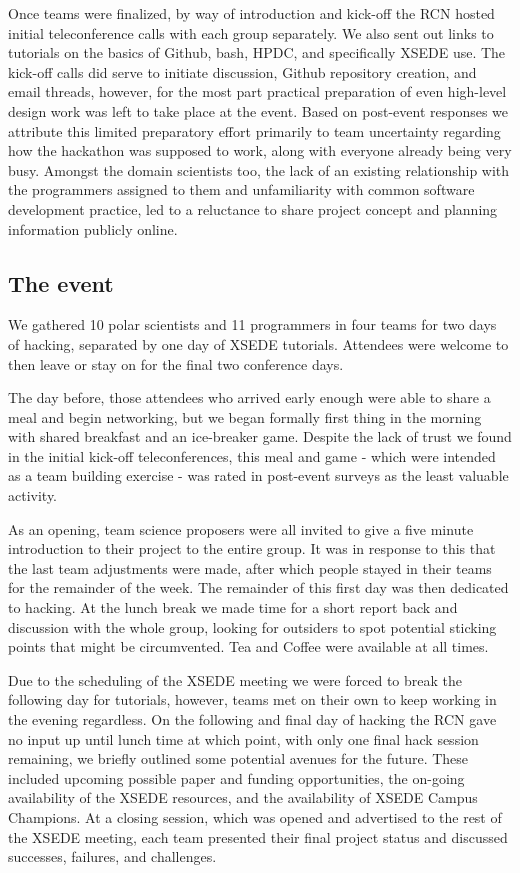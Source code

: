 \documentclass[conference]{IEEEtran}
\begin{document}
Once teams were finalized, by way of introduction and kick-off the RCN hosted initial teleconference calls with each group separately.  We also sent out links to tutorials on the basics of Github, bash, HPDC, and specifically XSEDE use. The kick-off calls did serve to initiate discussion, Github repository creation, and email threads, however, for the most part practical preparation of even high-level design work was left to take place at the event.  Based on post-event responses we attribute this limited preparatory effort primarily to team uncertainty regarding how the hackathon was supposed to work, along with everyone already being very busy.  Amongst the domain scientists too, the lack of an existing relationship with the programmers assigned to them and unfamiliarity with common software development practice, led to a reluctance to share project concept and planning information publicly online.

\subsection{The event}
We gathered 10 polar scientists and 11 programmers in four teams for two days of hacking, separated by one day of XSEDE tutorials. Attendees were welcome to then leave or stay on for the final two conference days.  

The day before, those attendees who arrived early enough were able to share a meal and begin networking, but we began formally first thing in the morning with shared breakfast and an ice-breaker game. Despite the lack of trust we found in the initial kick-off teleconferences, this meal and game - which were intended as a team building exercise - was rated in post-event surveys as the least valuable activity.

As an opening, team science proposers were all invited to give a five minute introduction to their project to the entire group. It was in response to this that the last team adjustments were made, after which people stayed in their teams for the remainder of the week. The remainder of this first day was then dedicated to hacking.  At the lunch break we made time for a short report back and discussion with the whole group, looking for outsiders to spot potential sticking points that might be circumvented.  Tea and Coffee were available at all times.

Due to the scheduling of the XSEDE meeting we were forced to break the following day for tutorials, however, teams met on their own to keep working in the evening regardless. On the following and final day of hacking the RCN gave no input up until lunch time at which point, with only one final hack session remaining, we briefly outlined some potential avenues for the future. These included upcoming possible paper and funding opportunities, the on-going availability of the XSEDE resources, and the availability of XSEDE Campus Champions. At a closing session, which was opened and advertised to the rest of the XSEDE meeting, each team presented their final project status and discussed successes, failures, and challenges.
\end{document}
